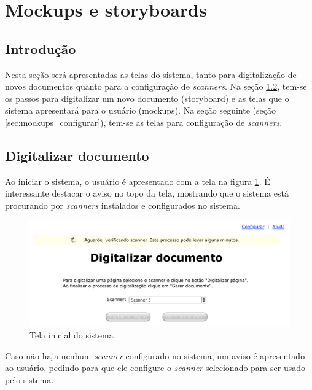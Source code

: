 \section{Mockups e storyboards}
\label{sec:mockups}

\subsection{Introdução}
\label{sec:mockups_intro}
Nesta seção será apresentadas as telas do sistema, tanto para digitalização de novos documentos quanto para a configuração de {\it scanners}. Na seção \ref{sec:mockups_digitalizar}, tem-se os passos para digitalizar um novo documento (storyboard) e as telas que o sistema apresentará para o usuário (mockups). Na seção seguinte (seção \ref{sec:mockups_configurar}), tem-se as telas para configuração de {\it scanners}.

\subsection{Digitalizar documento}
\label{sec:mockups_digitalizar}

Ao iniciar o sistema, o usuário é apresentado com a tela na figura \ref{fig:dig_1}. É interessante destacar o aviso no topo da tela, mostrando que o sistema está procurando por {\it scanners} instalados e configurados no sistema.

\begin{figure}[h]
 \centering
  \includegraphics[scale=0.6]{img/mockups/digitalizacao-1.pdf}
  \caption {Tela inicial do sistema}
  \label{fig:dig_1}
\end{figure}

Caso não haja nenhum {\it scanner} configurado no sistema, um aviso é apresentado ao usuário, pedindo para que ele configure o {\it scanner} selecionado para ser usado pelo sistema.

